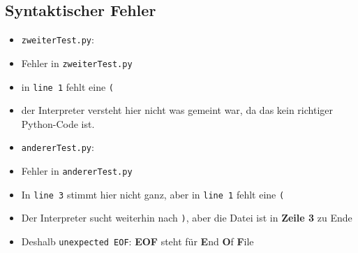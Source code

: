 \subsection{Syntaktischer Fehler}

\begin{frame}
	\slidehead
	\begin{itemize}
		\item \texttt{zweiterTest.py}:
		\pause
		\pause
		\item Fehler in \texttt{zweiterTest.py}
		\pause
		\item in \texttt{line 1} fehlt eine \texttt{(}
		\item der Interpreter versteht hier nicht was gemeint war, da das kein richtiger Python-Code ist.
	\end{itemize}
\end{frame}

\begin{frame}
	\slidehead
	\begin{itemize}
		\item \texttt{andererTest.py}:
		\pause
		\pause
		\item Fehler in \texttt{andererTest.py}
		\pause
		\item In \texttt{line 3} stimmt hier nicht ganz, aber in \texttt{line 1} fehlt eine \texttt{(}
		\pause
		\item Der Interpreter sucht weiterhin nach \texttt{)}, aber die Datei ist in \textbf{Zeile 3} zu Ende
		\pause
		\item Deshalb \texttt{unexpected EOF}: \textbf{EOF} steht für \textbf{E}nd \textbf{O}f \textbf{F}ile
	\end{itemize}
\end{frame}

\livecoding


